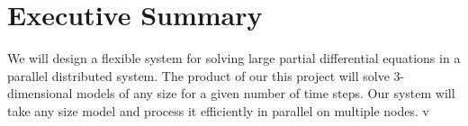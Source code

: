 \section*{Executive Summary}
We will design a flexible system for solving large partial differential equations in a parallel distributed system.  The product of our this project will solve 3-dimensional models of any size for a given number of time steps.  Our system will take any size model and process it efficiently in parallel on multiple nodes.
v
